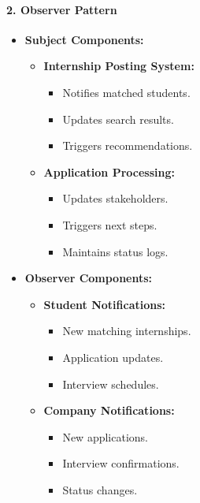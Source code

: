 \paragraph{2. Observer Pattern}
\begin{itemize}
    \item \textbf{Subject Components:}
    \begin{itemize}
        \item \textbf{Internship Posting System:}
        \begin{itemize}
            \item Notifies matched students.
            \item Updates search results.
            \item Triggers recommendations.
        \end{itemize}
        \item \textbf{Application Processing:}
        \begin{itemize}
            \item Updates stakeholders.
            \item Triggers next steps.
            \item Maintains status logs.
        \end{itemize}
    \end{itemize}
    \item \textbf{Observer Components:}
    \begin{itemize}
        \item \textbf{Student Notifications:}
        \begin{itemize}
            \item New matching internships.
            \item Application updates.
            \item Interview schedules.
        \end{itemize}
        \item \textbf{Company Notifications:}
        \begin{itemize}
            \item New applications.
            \item Interview confirmations.
            \item Status changes.
        \end{itemize}
    \end{itemize}
\end{itemize}

